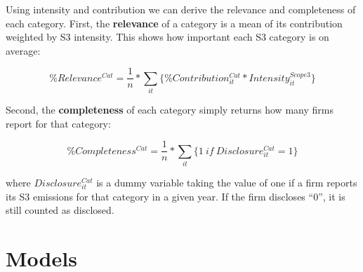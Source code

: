 \documentclass[12pt,twoside]{report}
\begin{document}
Using intensity and contribution we can derive the relevance and completeness of each category. First, the \textbf{relevance} of a category is a mean of its contribution weighted by S3 intensity. This shows how important each S3 category is on average:

\begin{equation}
    \mathit{\%Relevance^{Cat}} = \frac{1}{n}*\sum_{it}{\{\mathit{\%Contribution_{it}^{Cat}}*\mathit{Intensity_{it}^{Scope3}}\}}
\end{equation}

Second, the \textbf{completeness} of each category simply returns how many firms report for that category: 

\begin{equation}
    \mathit{\%Completeness^{Cat}} = \frac{1}{n}*\sum_{it}{\{1 \  \mathit{if \  Disclosure_{it}^{Cat}}=1\}}
\end{equation}

where $\mathit{Disclosure_{it}^{Cat}}$ is a dummy variable taking the value of one if a firm reports its S3 emissions for that category in a given year. If the firm discloses ``0'', it is still counted as disclosed.

\chapter{Models}
\end{document}
